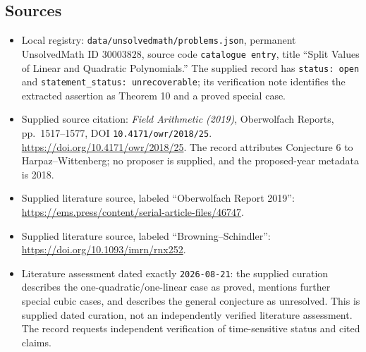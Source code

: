 \documentclass[11pt]{article}
\begin{document}
\subsection{Sources}
\begin{itemize}
\item Local registry: \texttt{data/unsolvedmath/problems.json}, permanent UnsolvedMath ID \(30003828\), source code \texttt{catalogue entry}, title ``Split Values of Linear and Quadratic Polynomials.'' The supplied record has \texttt{status: open} and \texttt{statement\_status: unrecoverable}; its verification note identifies the extracted assertion as Theorem 10 and a proved special case.
\item Supplied source citation: \emph{Field Arithmetic (2019)}, Oberwolfach Reports, pp.~1517--1577, DOI \texttt{10.4171/owr/2018/25}. \url{https://doi.org/10.4171/owr/2018/25}. The record attributes Conjecture 6 to Harpaz--Wittenberg; no proposer is supplied, and the proposed-year metadata is 2018.
\item Supplied literature source, labeled ``Oberwolfach Report 2019'': \url{https://ems.press/content/serial-article-files/46747}.
\item Supplied literature source, labeled ``Browning--Schindler'': \url{https://doi.org/10.1093/imrn/rnx252}.
\item Literature assessment dated exactly \texttt{2026-08-21}: the supplied curation describes the one-quadratic/one-linear case as proved, mentions further special cubic cases, and describes the general conjecture as unresolved. This is supplied dated curation, not an independently verified literature assessment. The record requests independent verification of time-sensitive status and cited claims.
\end{itemize}
\end{document}
